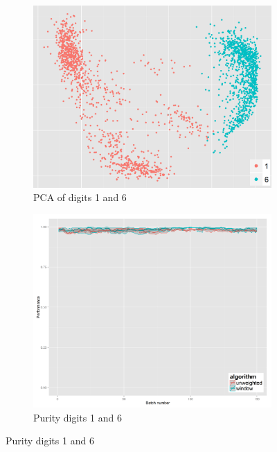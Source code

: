 \begin{figure}[H]

\begin{subfigure}{.3\textwidth}
  \centering
  \includegraphics[width=\linewidth]{PCA_pendigits_pairwise/pairwise_1_6_cropped.png}
  \caption{PCA of digits 1 and 6}
\end{subfigure}%
\begin{subfigure}{.3\textwidth}
  \centering
  \includegraphics[width=\linewidth]{pendigits_2_alg/uci_pendigits_16_ci_one_size_purity.png}
  \caption{Purity digits 1 and 6}
\end{subfigure}

\end{figure}
